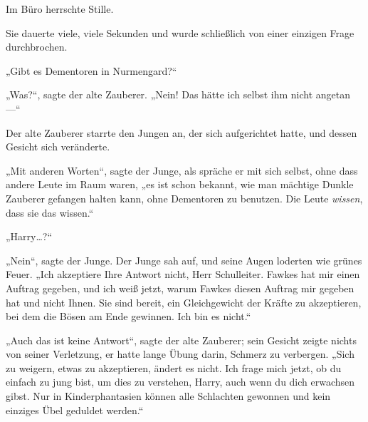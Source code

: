 Im Büro herrschte Stille.

Sie dauerte viele, viele Sekunden und wurde schließlich von einer einzigen Frage durchbrochen.

„Gibt es Dementoren in Nurmengard?“

„Was?“, sagte der alte Zauberer. „Nein! Das hätte ich selbst ihm nicht angetan—“

\later

Der alte Zauberer starrte den Jungen an, der sich aufgerichtet hatte, und dessen Gesicht sich veränderte.

„Mit anderen Worten“, sagte der Junge, als spräche er mit sich selbst, ohne dass andere Leute im Raum waren, „es ist schon bekannt, wie man mächtige Dunkle Zauberer gefangen halten kann, ohne Dementoren zu benutzen. Die Leute \emph{wissen}, dass sie das wissen.“

„Harry…?“

„Nein“, sagte der Junge. Der Junge sah auf, und seine Augen loderten wie grünes Feuer. „Ich akzeptiere Ihre Antwort nicht, Herr Schulleiter. Fawkes hat mir einen Auftrag gegeben, und ich weiß jetzt, warum Fawkes diesen Auftrag mir gegeben hat und nicht Ihnen. Sie sind bereit, ein Gleichgewicht der Kräfte zu akzeptieren, bei dem die Bösen am Ende gewinnen. Ich bin es nicht.“

„Auch das ist keine Antwort“, sagte der alte Zauberer; sein Gesicht zeigte nichts von seiner Verletzung, er hatte lange Übung darin, Schmerz zu verbergen. „Sich zu weigern, etwas zu akzeptieren, ändert es nicht. Ich frage mich jetzt, ob du einfach zu jung bist, um dies zu verstehen, Harry, auch wenn du dich erwachsen gibst. Nur in Kinderphantasien können alle Schlachten gewonnen und kein einziges Übel geduldet werden.“

